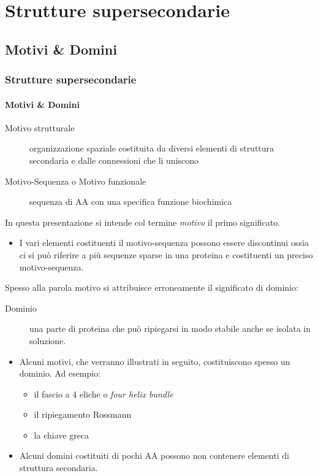 \documentclass{beamer}
\begin{document}
\section{Strutture supersecondarie}
\subsection{Motivi \& Domini}
\begin{frame}
 \frametitle{Strutture supersecondarie}
  \framesubtitle{Motivi \& Domini}
\begin{description}
\item [{Motivo strutturale}] organizzazione spaziale costituita da diversi elementi di struttura secondaria e dalle connessioni che li uniscono
\pause \item [{Motivo-Sequenza o Motivo funzionale}] sequenza di AA con una specifica funzione biochimica
\end{description}
\pause In questa presentazione si intende col termine \emph{motivo} il primo significato.
\begin{itemize}
 \item I vari elementi costituenti il motivo-sequenza possono essere discontinui ossia ci si può riferire a 
più sequenze sparse in una proteina e costituenti un preciso motivo-sequenza.
\end{itemize}
\end{frame}
\begin{frame}
Spesso alla parola motivo si attribuisce erroneamente il significato di dominio:
\begin{description}
\item [Dominio] una parte di proteina che può ripiegarsi in modo stabile anche se isolata in soluzione.
\end{description}\pause 
\begin{itemize}
\item Alcuni motivi, che verranno illustrati in seguito, costituiscono spesso un dominio. Ad esempio: 
\begin{itemize}
 \item il fascio a 4 eliche o \emph{four helix bundle}
 \item il  ripiegamento Rossmann
 \item la chiave greca
\end{itemize}\pause 
 \item Alcuni domini costituiti di pochi AA possono non contenere elementi di struttura secondaria.
\end{itemize}

\end{frame}
\end{document}
